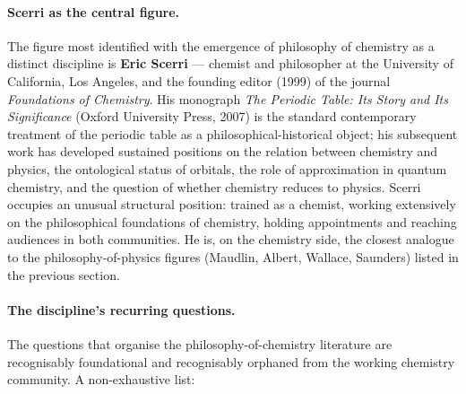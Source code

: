 \paragraph{Scerri as the central figure.}
The figure most identified with the emergence of philosophy of chemistry as a distinct discipline is \textbf{Eric Scerri} --- chemist and philosopher at the University of California, Los Angeles, and the founding editor (1999) of the journal \emph{Foundations of Chemistry}. His monograph \emph{The Periodic Table: Its Story and Its Significance} (Oxford University Press, 2007) is the standard contemporary treatment of the periodic table as a philosophical-historical object; his subsequent work has developed sustained positions on the relation between chemistry and physics, the ontological status of orbitals, the role of approximation in quantum chemistry, and the question of whether chemistry reduces to physics. Scerri occupies an unusual structural position: trained as a chemist, working extensively on the philosophical foundations of chemistry, holding appointments and reaching audiences in both communities. He is, on the chemistry side, the closest analogue to the philosophy-of-physics figures (Maudlin, Albert, Wallace, Saunders) listed in the previous section.

\paragraph{The discipline's recurring questions.}
The questions that organise the philosophy-of-chemistry literature are recognisably foundational and recognisably orphaned from the working chemistry community. A non-exhaustive list:

